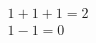\documentclass{article}
\begin{document}
\begin{gather}
  1 + 1 + 1 = 2 \\
  1 - 1 = 0
\end{gather}
\end{document}
